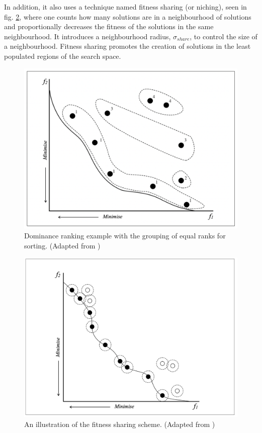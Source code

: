 \documentclass[mscthesis, 11pt]{usiinfthesis}
\theoremstyle{newdefinition}
\begin{document}
In addition, it also uses a technique named fitness sharing (or niching), seen in fig. \ref{fig:fitness_sharing}, where one counts how many solutions are in a neighbourhood of solutions and proportionally decreases the fitness of the solutions in the same neighbourhood. It introduces a neighbourhood radius, $\sigma_{share}$, to control the size of a neighbourhood. Fitness sharing promotes the creation of solutions in the least populated regions of the search space. \cite[~p.~81]{coello_coello_basic_2007} 
\begin{figure}[ht]
    \centering
    \includegraphics[scale=0.32]{literature_review/dominance_ranking.png}
    \caption{Dominance ranking example with the grouping of equal ranks for sorting. (Adapted from \cite[~p.~80]{coello_coello_basic_2007})}
    \label{fig:dominance_ranking}
\end{figure}
\begin{figure}[ht]
    \centering
    \includegraphics[scale=0.43]{literature_review/fitness_sharing.png}
    \caption{An illustration of the fitness sharing scheme. (Adapted from \cite[~p.~82]{coello_coello_basic_2007})}
    \label{fig:fitness_sharing}
\end{figure}
\end{document}
